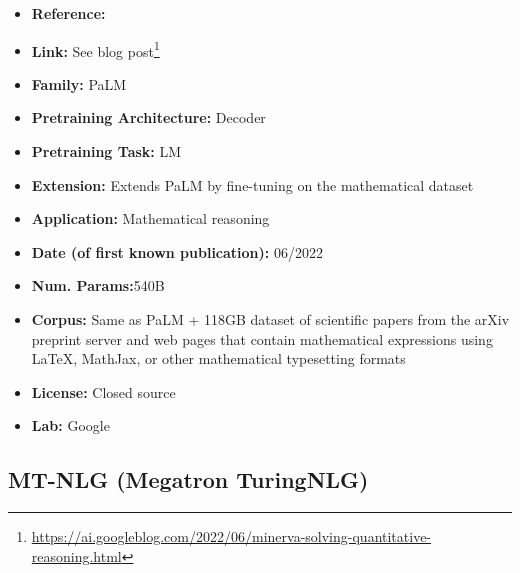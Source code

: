 \documentclass{article}
\begin{document}
            \begin{itemize}
                \item \textbf{Reference:} 
                \item \textbf{Link:} See blog post\footnote{\url{https://ai.googleblog.com/2022/06/minerva-solving-quantitative-reasoning.html}}
                \item \textbf{Family:} PaLM 
                \item \textbf{Pretraining Architecture:} Decoder
                \item \textbf{Pretraining Task:} LM
                \item \textbf{Extension:} Extends PaLM by fine-tuning on the mathematical dataset  
                \item \textbf{Application:} Mathematical reasoning
                \item \textbf{Date (of first known publication):} 06/2022
                \item \textbf{Num. Params:}540B
                \item \textbf{Corpus:} Same as PaLM + 118GB dataset of scientific papers from the arXiv preprint server and web pages that contain mathematical expressions using LaTeX, MathJax, or other mathematical typesetting formats
                \item \textbf{License:} Closed source
                \item \textbf{Lab:} Google
            \end{itemize}

\subsection{MT-NLG (Megatron TuringNLG)}
\end{document}
